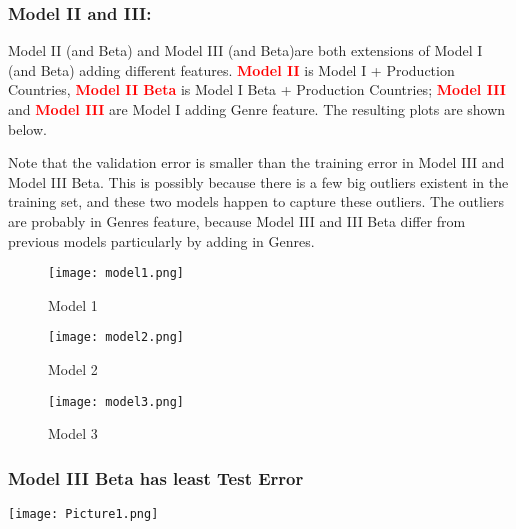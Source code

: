 \documentclass[12pt]{article}
\begin{document}
\subsubsection{Model II and III:}
Model II (and Beta) and Model III (and Beta)are both extensions of Model I (and Beta) adding different features. \textbf{\textcolor{red}{Model II}} is Model I + Production Countries, \textbf{\textcolor{red}{Model II Beta}} is Model I Beta + Production Countries; \textbf{\textcolor{red}{Model III}} and \textbf{\textcolor{red}{Model III}} are Model I adding Genre feature. The resulting plots are shown below. \par Note that the validation error is smaller than the training error in Model III and Model III Beta. This is possibly because there is a few big outliers existent in the training set, and these two models happen to capture these outliers. The outliers are probably in Genres feature, because Model III and III Beta differ from previous models particularly by adding in Genres.
\begin{figure}[h]
   \begin{minipage}{0.3\textwidth}
     \centering
     \texttt{[image: model1.png]}
     \caption{Model 1}
   \end{minipage}
   \begin{minipage}{0.3\textwidth}
     \centering
     \texttt{[image: model2.png]}
     \caption{Model 2}
   \end{minipage}
   \begin{minipage}{0.3\textwidth}
     \centering
     \texttt{[image: model3.png]}
     \caption{Model 3}
   \end{minipage}
\end{figure}
\FloatBarrier
\subsubsection{Model III Beta has least Test Error}
\texttt{[image: Picture1.png]}
\end{document}
